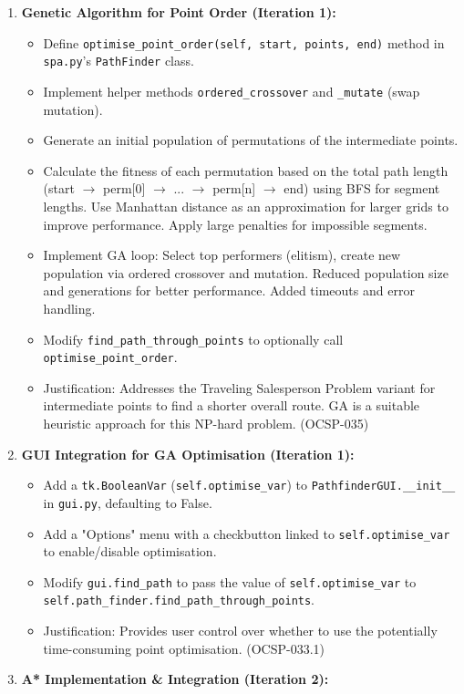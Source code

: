 \begin{enumerate}
	\item \textbf{Genetic Algorithm for Point Order (Iteration 1):}
	\begin{itemize}
		\item Define \verb|optimise_point_order(self, start, points, end)| method in \verb|spa.py|'s \verb|PathFinder| class.
		\item Implement helper methods \verb|ordered_crossover| and \verb|_mutate| (swap mutation).
		\item Generate an initial population of permutations of the intermediate points.
		\item Calculate the fitness of each permutation based on the total path length (start $\rightarrow$ perm[0] $\rightarrow$ ... $\rightarrow$ perm[n] $\rightarrow$ end) using BFS for segment lengths. Use Manhattan distance as an approximation for larger grids to improve performance. Apply large penalties for impossible segments.
		\item Implement GA loop: Select top performers (elitism), create new population via ordered crossover and mutation. Reduced population size and generations for better performance. Added timeouts and error handling.
		\item Modify \verb|find_path_through_points| to optionally call \verb|optimise_point_order|.
		\item Justification: Addresses the Traveling Salesperson Problem variant for intermediate points to find a shorter overall route. GA is a suitable heuristic approach for this NP-hard problem. (OCSP-035)
	\end{itemize}
	\item \textbf{GUI Integration for GA Optimisation (Iteration 1):}
	\begin{itemize}
		\item Add a \verb|tk.BooleanVar| (\verb|self.optimise_var|) to \verb|PathfinderGUI.__init__| in \verb|gui.py|, defaulting to False.
		\item Add a "Options" menu with a checkbutton linked to \verb|self.optimise_var| to enable/disable optimisation.
		\item Modify \verb|gui.find_path| to pass the value of \verb|self.optimise_var| to \verb|self.path_finder.find_path_through_points|.
		\item Justification: Provides user control over whether to use the potentially time-consuming point optimisation. (OCSP-033.1)
	\end{itemize}
	\item \textbf{A* Implementation \& Integration (Iteration 2):}

\end{enumerate}
